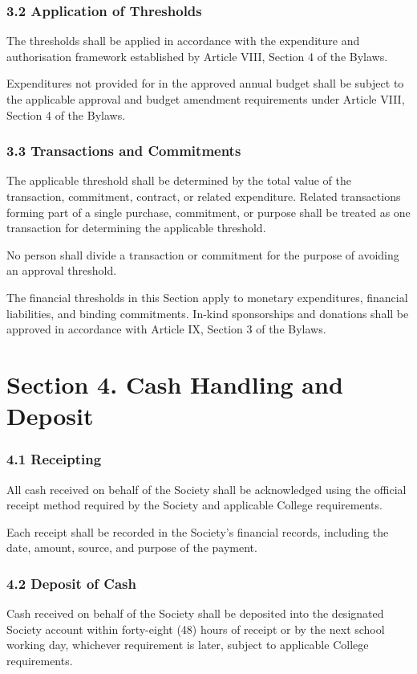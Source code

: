 \documentclass[a4paper]{article}
\begin{document}
\subsubsection*{3.2 Application of Thresholds}
The thresholds shall be applied in accordance with the expenditure and
authorisation framework established by Article VIII, Section 4 of the
Bylaws.

Expenditures not provided for in the approved annual budget shall be
subject to the applicable approval and budget amendment requirements
under Article VIII, Section 4 of the Bylaws.

\subsubsection*{3.3 Transactions and Commitments}
The applicable threshold shall be determined by the total value of the
transaction, commitment, contract, or related expenditure. Related
transactions forming part of a single purchase, commitment, or
purpose shall be treated as one transaction for determining the
applicable threshold.

No person shall divide a transaction or commitment for the purpose of
avoiding an approval threshold.

The financial thresholds in this Section apply to monetary
expenditures, financial liabilities, and binding commitments. In-kind
sponsorships and donations shall be approved in accordance with
Article IX, Section 3 of the Bylaws.

\section*{Section 4. Cash Handling and Deposit}

\subsubsection*{4.1 Receipting}
All cash received on behalf of the Society shall be acknowledged using
the official receipt method required by the Society and applicable
College requirements.

Each receipt shall be recorded in the Society's financial records,
including the date, amount, source, and purpose of the payment.

\subsubsection*{4.2 Deposit of Cash}
Cash received on behalf of the Society shall be deposited into the
designated Society account within forty-eight (48) hours of receipt or
by the next school working day, whichever requirement is later,
subject to applicable College requirements.
\end{document}
